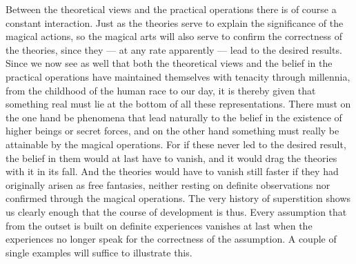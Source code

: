 \documentclass[12pt,a4paper,openany]{book}
\newcommand{\opage}[1]{\marginnote{\footnotesize\textit{[#1]}}}
\begin{document}
Between the theoretical views and the practical operations
there is of course a constant interaction. Just as
the theories serve to explain the significance of the magical actions,
so the magical arts will also serve to confirm
the correctness of the theories, since they --- at any rate apparently
--- lead to the desired results. Since we now see as well that
both the theoretical views and the belief in the practical
operations have maintained themselves with tenacity through
millennia, from the childhood of the human race to our day,
it is thereby given that something real must lie at the
bottom of all these representations. There must on the one hand
be phenomena that lead naturally to the belief in the existence of higher
beings or secret forces, and on
the other hand something must really be attainable by the magical
\setcounter{footnote}{0}%
\opage{284}operations. For if these never led to the desired result,
the belief in them would at last have to vanish, and it would drag
the theories with it in its fall. And the theories would have to vanish
still faster if they had originally arisen as free
fantasies, neither resting on definite observations
nor confirmed through the magical operations. The very
history of superstition shows us clearly enough that the course of
development is thus. Every assumption that from the outset is
built on definite experiences vanishes at last when the experiences
no longer speak for the correctness of the assumption. A couple of
single examples will suffice to illustrate this.
\end{document}
